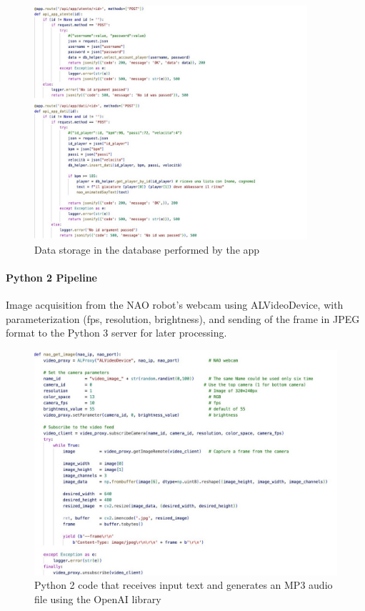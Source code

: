 \documentclass{optica-article}
\begin{document}
\begin{figure}[H]
\centering
\includegraphics[width=0.9\textwidth]{figures/py3_2.jpeg}
\caption{Data storage in the database performed by the app}
\label{fig:py3_2}
\end{figure}

\FloatBarrier

\paragraph{Python 2 Pipeline}
Image acquisition from the NAO robot's webcam using ALVideoDevice, with parameterization (fps, resolution, brightness), and sending of the frame in JPEG format to the Python 3 server for later processing.

\begin{figure}[H]
\centering
\includegraphics[width=\textwidth]{figures/py3_1.jpeg}
\caption{Python 2 code that receives input text and generates an MP3 audio file using the OpenAI library}
\label{fig:py2}
\end{figure}
\end{document}
